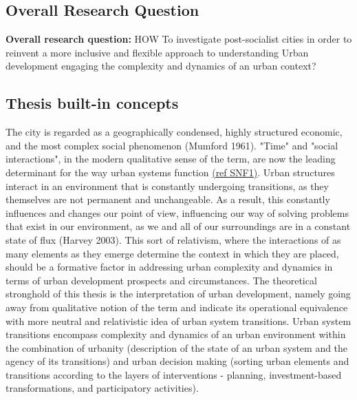\documentclass[11pt]{report}
\begin{document}
\subsection{Overall Research Question}

\textbf{Overall research question:} HOW To investigate  post-socialist cities in order to reinvent a more inclusive and flexible approach to understanding Urban development engaging the complexity and dynamics of an urban context? 

\subsection{Thesis built-in concepts}
The city is regarded as a geographically condensed, highly structured economic, and the most complex social phenomenon (Mumford 1961). "Time" and "social interactions", in the modern qualitative sense of the term, are now the leading determinant for the way urban systems function \href{ref}{(ref SNF1)}. Urban structures interact in an environment that is constantly undergoing transitions, as they themselves are not permanent and unchangeable. As a result, this constantly influences and changes our point of view, influencing our way of solving problems that exist in our environment, as we and all of our surroundings are in a constant state of flux (Harvey 2003). This sort of relativism, where the interactions of as many elements as they emerge determine the context in which they are placed, should be a formative factor in addressing urban complexity and dynamics in terms of urban development prospects and circumstances. The theoretical stronghold of this thesis is the interpretation of urban development, namely going away from qualitative notion of the term and indicate its operational equivalence with more neutral and relativistic idea of urban system transitions. Urban system transitions encompass complexity and dynamics of an urban environment within the combination of urbanity (description of the state of an urban system and the agency of its transitions) and urban decision making (sorting urban elements and transitions according to the layers of interventions - planning, investment-based transformations, and participatory activities).
\\ 
\end{document}

